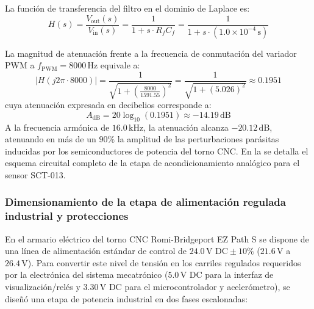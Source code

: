 La función de transferencia del filtro en el dominio de Laplace es:
\begin{equation}
H(s) = \frac{V_{\text{out}}(s)}{V_{\text{in}}(s)} = \frac{1}{1 + s \cdot R_f C_f} = \frac{1}{1 + s \cdot (1.0 \times 10^{-4}\,\text{s})}
\label{eq:mp_funcion_transferencia_rc}
\end{equation}

La magnitud de atenuación frente a la frecuencia de conmutación del variador PWM a $f_{\text{PWM}} = 8000\,\text{Hz}$ equivale a:
\begin{equation}
|H(j 2\pi \cdot 8000)| = \frac{1}{\sqrt{1 + \left(\frac{8000}{1591.55}\right)^2}} = \frac{1}{\sqrt{1 + (5.026)^2}} \approx 0.1951
\label{eq:mp_atenuacion_8khz}
\end{equation}
\noindent cuya atenuación expresada en decibelios corresponde a:
\begin{equation}
A_{\text{dB}} = 20\log_{10}(0.1951) \approx -14.19\,\text{dB}
\label{eq:mp_atenuacion_db}
\end{equation}
A la frecuencia armónica de $16.0\,\text{kHz}$, la atenuación alcanza $-20.12\,\text{dB}$, atenuando en más de un $90\%$ la amplitud de las perturbaciones parásitas inducidas por los semiconductores de potencia del torno CNC. En la  se detalla el esquema circuital completo de la etapa de acondicionamiento analógico para el sensor SCT-013.


\subsubsection{Dimensionamiento de la etapa de alimentación regulada industrial y protecciones}
\label{subsubsec:fuente_alimentacion_protecciones}

En el armario eléctrico del torno CNC Romi-Bridgeport EZ Path S se dispone de una línea de alimentación estándar de control de $24.0\,\text{V DC} \pm 10\%$ ($21.6\,\text{V}$ a $26.4\,\text{V}$). Para convertir este nivel de tensión en los carriles regulados requeridos por la electrónica del sistema mecatrónico ($5.0\,\text{V DC}$ para la interfaz de visualización/relés y $3.30\,\text{V DC}$ para el microcontrolador y acelerómetro), se diseñó una etapa de potencia industrial en dos fases escalonadas:

